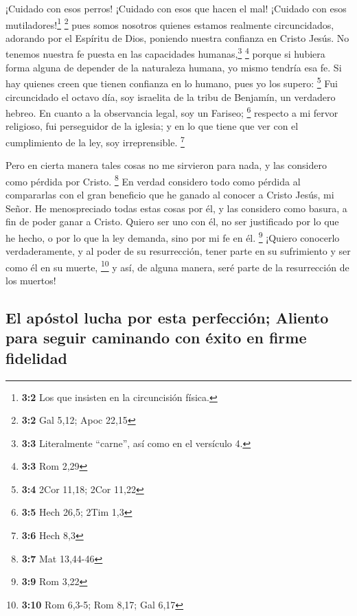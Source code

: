  ¡Cuidado con esos perros! ¡Cuidado con esos que hacen el
mal! ¡Cuidado con esos mutiladores!\footnote{\textbf{3:2} Los que
  insisten en la circuncisión física.} \footnote{\textbf{3:2} Gal 5,12;
  Apoc 22,15}  pues somos nosotros quienes estamos
realmente circuncidados, adorando por el Espíritu de Dios, poniendo
nuestra confianza en Cristo Jesús. No tenemos nuestra fe puesta en las
capacidades humanas,\footnote{\textbf{3:3} Literalmente ``carne'', así
  como en el versículo 4.} \footnote{\textbf{3:3} Rom 2,29}
 porque si hubiera forma alguna de depender de la
naturaleza humana, yo mismo tendría esa fe. Si hay quienes creen que
tienen confianza en lo humano, pues yo los supero: \footnote{\textbf{3:4}
  2Cor 11,18; 2Cor 11,22}  Fui circuncidado el octavo día,
soy israelita de la tribu de Benjamín, un verdadero hebreo. En cuanto a
la observancia legal, soy un Fariseo; \footnote{\textbf{3:5} Hech 26,5;
  2Tim 1,3}  respecto a mi fervor religioso, fui
perseguidor de la iglesia; y en lo que tiene que ver con el cumplimiento
de la ley, soy irreprensible. \footnote{\textbf{3:6} Hech 8,3}

 Pero en cierta manera tales cosas no me sirvieron para
nada, y las considero como pérdida por Cristo. \footnote{\textbf{3:7}
  Mat 13,44-46}  En verdad considero todo como pérdida al
compararlas con el gran beneficio que he ganado al conocer a Cristo
Jesús, mi Señor. He menospreciado todas estas cosas por él, y las
considero como basura, a fin de poder ganar a Cristo. 
Quiero ser uno con él, no ser justificado por lo que he hecho, o por lo
que la ley demanda, sino por mi fe en él. \footnote{\textbf{3:9} Rom
  3,22}  ¡Quiero conocerlo verdaderamente, y al poder de
su resurrección, tener parte en su sufrimiento y ser como él en su
muerte, \footnote{\textbf{3:10} Rom 6,3-5; Rom 8,17; Gal 6,17}
 y así, de alguna manera, seré parte de la resurrección
de los muertos!

\hypertarget{el-apuxf3stol-lucha-por-esta-perfecciuxf3n-aliento-para-seguir-caminando-con-uxe9xito-en-firme-fidelidad}{%
\subsection{El apóstol lucha por esta perfección; Aliento para seguir
caminando con éxito en firme
fidelidad}\label{el-apuxf3stol-lucha-por-esta-perfecciuxf3n-aliento-para-seguir-caminando-con-uxe9xito-en-firme-fidelidad}}

